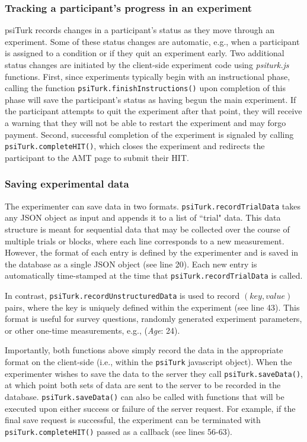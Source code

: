 \documentclass[twocolumn]{svjour3}          %
\begin{document}
\subsubsection{Tracking a participant's progress in an experiment} 

psiTurk records changes in a participant's status as they move through an experiment. 
Some of these status changes are automatic, e.g., when a participant is assigned to a condition or if they quit an experiment early. 
Two additional status changes are initiated by the client-side experiment code using \emph{psiturk.js} functions.
First, since experiments typically begin with an instructional phase, calling the function \texttt{psiTurk.finishInstructions()} upon completion of this phase will save the participant's status as having begun the main experiment.
If the participant attempts to quit the experiment after that point, they will receive a warning that they will not be able to restart the experiment and may forgo payment.
Second, successful completion of the experiment is signaled by calling \texttt{psiTurk.completeHIT()}, which closes the experiment and redirects the participant to the AMT page to submit their HIT.

\subsubsection{Saving experimental data} 

The experimenter can save data in two formats.
\texttt{psiTurk.recordTrialData} takes any JSON object as input and appends it to a list of ``trial" data.
This data structure is meant for sequential data that may be collected over the course of multiple trials or blocks, where each line corresponds to a new measurement.
However, the format of each entry is defined by the experimenter and is saved in the database as a single JSON object (see line 20).
Each new entry is automatically time-stamped at the time that \texttt{psiTurk.recordTrialData} is called.

In contrast, \texttt{psiTurk.recordUnstructuredData} is used to record $(key, value)$ pairs, where the key is uniquely defined within the experiment (see line 43).
This format is useful for survey questions, randomly generated experiment parameters, or other one-time measurements, e.g., (\emph{Age}: 24).

Importantly, both functions above simply record the data in the appropriate format on the client-side (i.e., within the \texttt{psiTurk} javascript object).
When the experimenter wishes to save the data to the server they call \texttt{psiTurk.saveData()}, at which point both sets of data are sent to the server to be recorded in the database.
\texttt{psiTurk.saveData()} can also be called with functions that will be executed upon either success or failure of the server request.
For example, if the final save request is successful, the experiment can be terminated with \texttt{psiTurk.completeHIT()} passed as a callback (see lines 56-63).  
\end{document}
